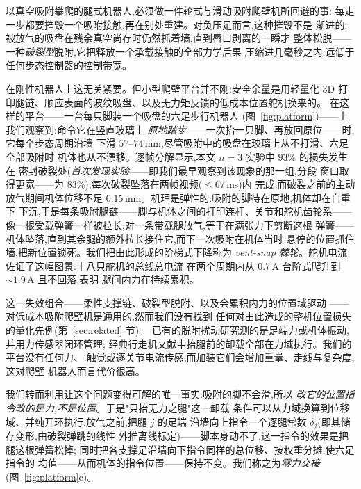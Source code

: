\documentclass[journal]{IEEEtran}
\begin{document}
以真空吸附攀爬的腿式机器人,必须做一件轮式与滑动吸附爬壁机所回避的事:
每走一步都要摧毁一个吸附接触,再在别处重建。对负压足而言,这种摧毁不是
渐进的:被放气的吸盘在残余真空尚存时仍然抓着墙,直到唇口剥离的一瞬才
整体松脱——一种\emph{破裂型}脱附,它把释放一个承载接触的全部力学后果
压缩进几毫秒之内,远低于任何步态控制器的控制带宽。

在刚性机器人上这无关紧要。但小型爬壁平台并不刚:安全余量是用轻量化
3D 打印腿链、顺应表面的波纹吸盘、以及无力矩反馈的低成本位置舵机换来的。
在这样的平台——一台每只脚装一个吸盘的六足步行机器人
(图~\ref{fig:platform})——上我们观察到:命令它在竖直玻璃上
\emph{原地踏步}——一次抬一只脚、再放回原位——时,它每个步态周期沿墙
下滑 $57$--$74$\,mm,尽管吸附中的吸盘在玻璃上从不打滑、六足全部吸附时
机体也从不漂移。逐帧分解显示,本文 $n{=}3$ 实验中 $93\%$ 的损失发生在
密封破裂处(\emph{首次发现实验}——即我们最早观察到该现象的那一组,分段
窗口取得更宽——为 $83\%$);每次破裂坠落在两帧视频($\le67$\,ms)内
完成,而破裂之前的主动放气期间机体位移不足 $0.15$\,mm。机理是弹性的:吸附的脚待在原地,机体却在自重下
下沉,于是每条吸附腿链——脚与机体之间的打印连杆、关节和舵机齿轮系——
像一根受载弹簧一样被拉长;对一条带载腿放气,等于在满张力下剪断这根
弹簧——机体坠落,直到其余腿的额外拉长接住它,而下一次吸附在机体当时
悬停的位置抓住墙,把新位置锁死。我们把由此形成的阶梯式下降称为
\emph{vent-snap 棘轮}。舵机电流佐证了这幅图景:十八只舵机的总线总电流
在两个周期内从 $0.7$\,A 台阶式爬升到 ${\sim}1.9$\,A 且不回落,表明
腿间内力在持续累积。

这一失效组合——柔性支撑链、破裂型脱附、以及会累积内力的位置域驱动
\cite{gorner2009dlr}——对低成本吸附爬壁机是通用的,然而我们没有找到
任何对由此造成的整机位置损失的量化先例(第~\ref{sec:related} 节)。
已有的脱附扰动研究测的是足端力或机体振动,并用力传感器闭环管理;
经典行走机文献中抬腿前的卸载全部在力域执行。我们的平台没有任何力、
触觉或逐关节电流传感,而加装它们会增加重量、走线与复杂度,这对爬壁
机器人而言代价很高。

我们转而利用让这个问题变得可解的唯一事实:吸附的脚不会滑,所以
\emph{改它的位置指令改的是力,不是位置}。于是"只抬无力之腿"这一卸载
条件可以从力域换算到位移域、并纯开环执行:放气之前,把腿 $j$ 的足端
沿墙向上指令一个逐腿常数 $\delta_j$(即其储存变形,由破裂弹跳的线性
外推离线标定)——脚本身动不了,这一指令的效果是把腿这根弹簧松掉;
同时把各支撑足沿墙向下指令同样的总位移、按权重分摊,使六足指令的
均值——从而机体的指令位置——保持不变。我们称之为\emph{零力交接}
(图~\ref{fig:platform}c)。
\end{document}
